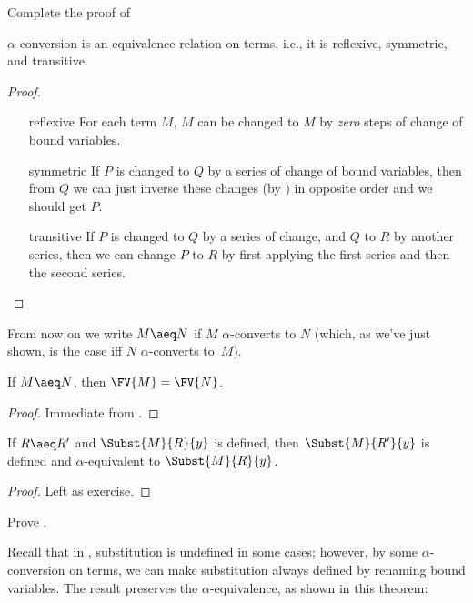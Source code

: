 \documentclass[../../../include/open-logic-section]{subfiles}
\begin{document}
\begin{prob}
  Complete the proof of 
\end{prob}

\begin{thm}
  $\alpha$-conversion is an equivalence relation on terms, i.e., it is
  reflexive, symmetric, and transitive.
\end{thm}

\begin{proof}
  \begin{enumerate}
  \item[reflexive] For each term $M$, $M$ can be changed to $M$ by
    \emph{zero} steps of change of bound variables.
  \item[symmetric] If $P$ is changed to $Q$ by a series of change
    of bound variables, then from $Q$ we can just inverse these
    changes (by ) in
    opposite order and we should get $P$.
  \item[transitive] If $P$ is changed to $Q$ by a series of
    change, and $Q$ to $R$ by another series, then we can change
    $P$ to $R$ by first applying the first series and then the
    second series.
  \end{enumerate}
\end{proof}

From now on we write $M \aeq N$ if $M$ $\alpha$-converts to $N$
(which, as we've just shown, is the case iff $N$ $\alpha$-converts
to~$M$).

\begin{thm}
  If $M \aeq N$, then $\FV{M} = \FV{N}$.
\end{thm}

\begin{proof}
  Immediate from .
\end{proof}

\begin{lem}
  If $R \aeq R'$ and $\Subst{M}{R}{y}$ is defined, then $\Subst{M}{R'}{y}$ is
  defined and $\alpha$-equivalent to $\Subst{M}{R}{y}$.
\end{lem}

\begin{proof}
  Left as exercise.
\end{proof}

\begin{prob}
  Prove .
\end{prob}

Recall that in , substitution is undefined in some
cases; however, by some $\alpha$-conversion on terms, we can make
substitution always defined by renaming bound variables. The result
preserves the $\alpha$-equivalence, as shown in this theorem:
\end{document}
